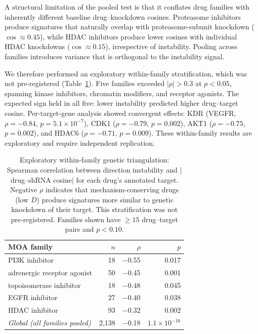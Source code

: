 \documentclass{article}
\begin{document}
A structural limitation of the pooled test is that it conflates drug
families with inherently different baseline drug--knockdown cosines.
Proteasome inhibitors produce signatures that naturally overlap with
proteasome-subunit knockdown ($\cos \approx 0.45$), while HDAC
inhibitors produce lower cosines with individual HDAC knockdowns
($\cos \approx 0.15$), irrespective of instability. Pooling across
families introduces variance that is orthogonal to the instability
signal.

We therefore performed an exploratory within-family stratification,
which was not pre-registered (Table~\ref{tab:triangulation}). Five
families exceeded $|\rho| > 0.3$ at $p < 0.05$, spanning kinase
inhibitors, chromatin modifiers, and receptor agonists. The expected
sign held in all five: lower instability predicted higher drug--target
cosine. Per-target-gene analysis showed convergent effects:
KDR (VEGFR, $\rho = -0.84$, $p = 5.1 \times 10^{-7}$), CDK1
($\rho = -0.79$, $p = 0.002$), AKT1 ($\rho = -0.75$, $p = 0.002$),
and HDAC6 ($\rho = -0.71$, $p = 0.009$). These within-family results
are exploratory and require independent replication.

\begin{table}[t]
\centering
\caption{Exploratory within-family genetic triangulation: Spearman
correlation between direction instability and $|$drug--shRNA cosine$|$ for
each drug's annotated target. Negative $\rho$ indicates that
mechanism-conserving drugs (low $D$) produce signatures more similar to
genetic knockdown of their target. This stratification was not pre-registered.
Families shown have $\geq 15$ drug--target pairs and $p < 0.10$.}
\label{tab:triangulation}
\small
\begin{tabular}{lrrr}
\toprule
MOA family & $n$ & $\rho$ & $p$ \\
\midrule
PI3K inhibitor & 18 & $-$0.55 & 0.017 \\
adrenergic receptor agonist & 50 & $-$0.45 & 0.001 \\
topoisomerase inhibitor & 18 & $-$0.48 & 0.045 \\
EGFR inhibitor & 27 & $-$0.40 & 0.038 \\
HDAC inhibitor & 93 & $-$0.32 & 0.002 \\
\midrule
\emph{Global (all families pooled)} & 2{,}138 & $-$0.18 & $1.1 \times 10^{-16}$ \\
\bottomrule
\end{tabular}
\end{table}
\end{document}
